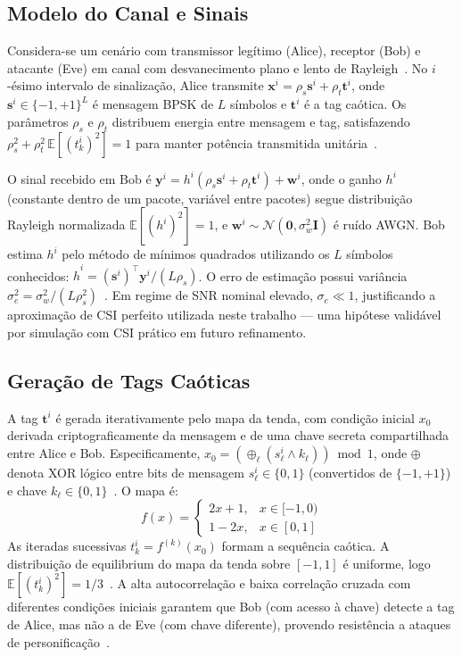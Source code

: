 \documentclass[12pt,a4paper]{article}
\begin{document}
\subsection{Modelo do Canal e Sinais}

Considera-se um cenário com transmissor legítimo (Alice), receptor (Bob) e atacante (Eve) em canal com desvanecimento plano e lento de Rayleigh~\cite{ref_poor}. No $i$-ésimo intervalo de sinalização, Alice transmite $\mathbf{x}^i = \rho_s \mathbf{s}^i + \rho_t \mathbf{t}^i$, onde $\mathbf{s}^i \in \{-1,+1\}^L$ é mensagem BPSK de $L$ símbolos e $\mathbf{t}^i$ é a tag caótica. Os parâmetros $\rho_s$ e $\rho_t$ distribuem energia entre mensagem e tag, satisfazendo $\rho_s^2 + \rho_t^2\,\mathbb{E}[(t_k^i)^2] = 1$ para manter potência transmitida unitária~\cite{ref_joao}.

O sinal recebido em Bob é $\mathbf{y}^i = h^i(\rho_s \mathbf{s}^i + \rho_t \mathbf{t}^i) + \mathbf{w}^i$, onde o ganho $h^i$ (constante dentro de um pacote, variável entre pacotes) segue distribuição Rayleigh normalizada $\mathbb{E}[(h^i)^2]=1$, e $\mathbf{w}^i \sim \mathcal{N}(\mathbf{0}, \sigma_w^2\mathbf{I})$ é ruído AWGN. Bob estima $h^i$ pelo método de mínimos quadrados utilizando os $L$ símbolos conhecidos: $\hat{h}^i = (\mathbf{s}^i)^\top \mathbf{y}^i/(L\rho_s)$. O erro de estimação possui variância $\sigma_e^2 = \sigma_w^2/(L\rho_s^2)$~\cite{ref_kay}. Em regime de SNR nominal elevado, $\sigma_e \ll 1$, justificando a aproximação de CSI perfeito utilizada neste trabalho — uma hipótese validável por simulação com CSI prático em futuro refinamento.

\subsection{Geração de Tags Caóticas}

A tag $\mathbf{t}^i$ é gerada iterativamente pelo mapa da tenda, com condição inicial $x_0$ derivada criptograficamente da mensagem e de uma chave secreta compartilhada entre Alice e Bob. Especificamente, $x_0 = (\oplus_\ell (s_\ell^i \land k_\ell)) \bmod 1$, onde $\oplus$ denota XOR lógico entre bits de mensagem $s_\ell^i \in \{0,1\}$ (convertidos de $\{-1,+1\}$) e chave $k_\ell \in \{0,1\}$~\cite{ref_joao}. O mapa é:
\begin{equation}\label{eq:tentmap}
    f(x) = \begin{cases} 2x+1, & x \in [-1,0) \\ 1-2x, & x \in [0,1] \end{cases}
\end{equation}
As iteradas sucessivas $t_k^i = f^{(k)}(x_0)$ formam a sequência caótica. A distribuição de equilibrium do mapa da tenda sobre $[-1,1]$ é uniforme, logo $\mathbb{E}[(t_k^i)^2] = 1/3$~\cite{ref_poor}. A alta autocorrelação e baixa correlação cruzada com diferentes condições iniciais garantem que Bob (com acesso à chave) detecte a tag de Alice, mas não a de Eve (com chave diferente), provendo resistência a ataques de personificação~\cite{ref_joao}.
\end{document}
